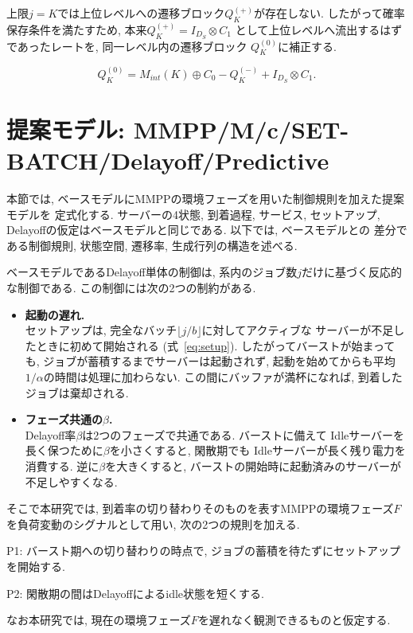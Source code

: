 \documentclass[a4paper, 11pt, dvipdfmx]{jsreport}
\begin{document}
上限$j=K$では上位レベルへの遷移ブロック$Q^{(+)}_K$が存在しない. 
したがって確率保存条件を満たすため, 本来$Q^{(+)}_K = I_{D_S} \otimes C_1$
として上位レベルへ流出するはずであったレートを, 同一レベル内の遷移ブロック
$Q^{(0)}_K$に補正する. 

\begin{equation}
    Q^{(0)}_{K} = M_{int}(K) \oplus C_0 - Q^{(-)}_{K} + I_{D_S} \otimes C_1. 
\end{equation}

\section{提案モデル: MMPP/M/c/SET-BATCH/Delayoff/Predictive}
\label{sec:predictive-model}
 
本節では, ベースモデルにMMPPの環境フェーズを用いた制御規則を加えた提案モデルを
定式化する. サーバーの4状態, 到着過程, サービス, 
セットアップ, Delayoffの仮定はベースモデルと同じである. 以下では, ベースモデルとの
差分である制御規則, 状態空間, 遷移率, 生成行列の構造を述べる. 

ベースモデルであるDelayoff単体の制御は, 系内のジョブ数$j$だけに基づく反応的な制御である. 
この制御には次の2つの制約がある. 
 
\begin{itemize}
    \item \textbf{起動の遅れ.}\\
    セットアップは, 完全なバッチ$\lfloor j/b \rfloor$に対してアクティブな
    サーバーが不足したときに初めて開始される (式~\eqref{eq:setup}). 
    したがってバーストが始まっても, ジョブが蓄積するまでサーバーは起動されず, 
    起動を始めてからも平均$1/\alpha$の時間は処理に加わらない. 
    この間にバッファが満杯になれば, 到着したジョブは棄却される. 
 
    \item \textbf{フェーズ共通の$\beta$.}\\
    Delayoff率$\beta$は2つのフェーズで共通である. バーストに備えて
    Idleサーバーを長く保つために$\beta$を小さくすると, 閑散期でも
    Idleサーバーが長く残り電力を消費する. 逆に$\beta$を大きくすると, 
    バーストの開始時に起動済みのサーバーが不足しやすくなる. 
\end{itemize}
 
そこで本研究では, 到着率の切り替わりそのものを表すMMPPの環境フェーズ$F$を負荷変動のシグナルとして用い, 次の2つの規則を加える. 
\begin{description}
  \item P1: バースト期への切り替わりの時点で, ジョブの蓄積を待たずにセットアップを開始する. 
  \item P2: 閑散期の間はDelayoffによるidle状態を短くする. 
\end{description}
なお本研究では, 現在の環境フェーズ$F$を遅れなく観測できるものと仮定する. 
\end{document}
